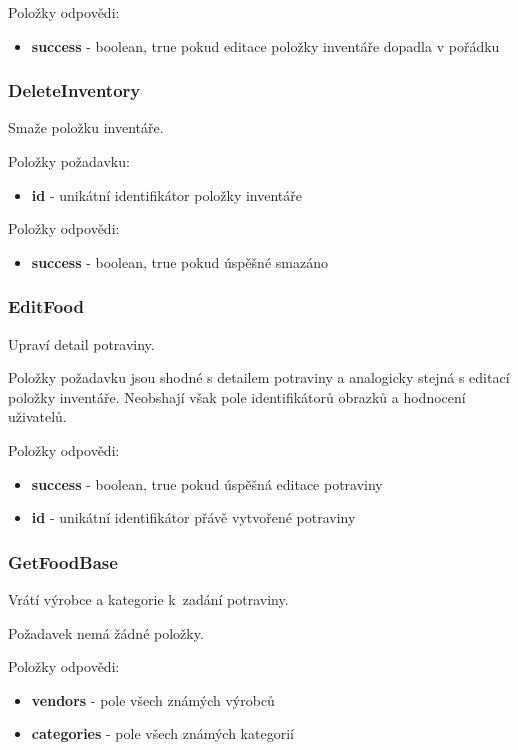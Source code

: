 \documentclass[thesis=B,czech]{FITthesis}[2013/10/20]
\begin{document}
Položky odpovědi:
\begin{itemize}
  \item \textbf{success} - boolean, true pokud editace položky inventáře dopadla v pořádku
\end{itemize}

\subsubsection{DeleteInventory}
Smaže položku inventáře.

Položky požadavku:
\begin{itemize}
  \item \textbf{id} - unikátní identifikátor položky inventáře
\end{itemize}

Položky odpovědi:
\begin{itemize}
  \item \textbf{success} - boolean, true pokud úspěšné smazáno
\end{itemize}

\subsubsection{EditFood}
Upraví detail potraviny.

Položky požadavku jsou shodné s detailem potraviny a analogicky stejná s editací položky inventáře. Neobshají však pole identifikátorů obrazků a hodnocení uživatelů.

Položky odpovědi:
\begin{itemize}
  \item \textbf{success} - boolean, true pokud úspěšná editace potraviny
  \item \textbf{id} - unikátní identifikátor přávě vytvořené potraviny
\end{itemize}

\subsubsection{GetFoodBase}
Vrátí výrobce a kategorie k~zadání potraviny.

Požadavek nemá žádné položky.

Položky odpovědi:
\begin{itemize}
  \item \textbf{vendors} - pole všech známých výrobců
  \item \textbf{categories} - pole všech známých kategorií
\end{itemize}
\end{document}
